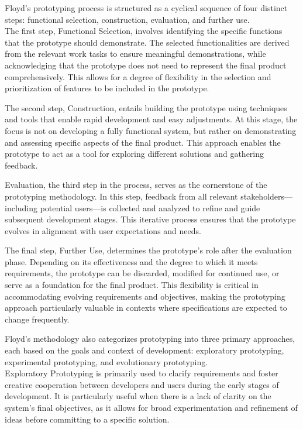 Floyd’s prototyping process is structured as a cyclical sequence of four distinct steps: functional selection,
construction, evaluation, and further use.\\ The first step, Functional Selection, involves identifying the specific
functions that the prototype should demonstrate. The selected functionalities are derived from the relevant work tasks
to ensure meaningful demonstrations, while acknowledging that the prototype does not need to represent the final product
comprehensively. This allows for a degree of flexibility in the selection and prioritization of features to be included
in the prototype.\autocite[cf.][p.4]{floydSystematicLookPrototyping1984}

The second step, Construction, entails building the prototype using techniques and tools that enable rapid development
and easy adjustments. At this stage, the focus is not on developing a fully functional system, but rather on
demonstrating and assessing specific aspects of the final product. This approach enables the prototype to act as a tool
for exploring different solutions and gathering feedback.\autocite[cf.][p.4]{floydSystematicLookPrototyping1984}

Evaluation, the third step in the process, serves as the cornerstone of the prototyping methodology. In this step,
feedback from all relevant stakeholders—including potential users—is collected and analyzed to refine and guide
subsequent development stages. This iterative process ensures that the prototype evolves in alignment with user
expectations and needs.\autocite[cf.][p.4--5]{floydSystematicLookPrototyping1984}

The final step, Further Use, determines the prototype's role after the evaluation phase. Depending on its effectiveness
and the degree to which it meets requirements, the prototype can be discarded, modified for continued use, or serve as a
foundation for the final product. This flexibility is critical in accommodating evolving requirements and objectives,
making the prototyping approach particularly valuable in contexts where specifications are expected to change
frequently.\autocite[cf.][p.5]{floydSystematicLookPrototyping1984}

Floyd’s methodology also categorizes prototyping into three primary approaches, each based on the goals and context of
development: exploratory prototyping, experimental prototyping, and evolutionary prototyping.
\autocite[cf.][p.6]{floydSystematicLookPrototyping1984}\\ Exploratory Prototyping is
primarily used to clarify requirements and foster creative cooperation between developers and users during the early
stages of development. It is particularly useful when there is a lack of clarity on the system’s final objectives, as it
allows for broad experimentation and refinement of ideas before committing to a specific solution.
\autocite[cf.][p.6--7]{floydSystematicLookPrototyping1984}

